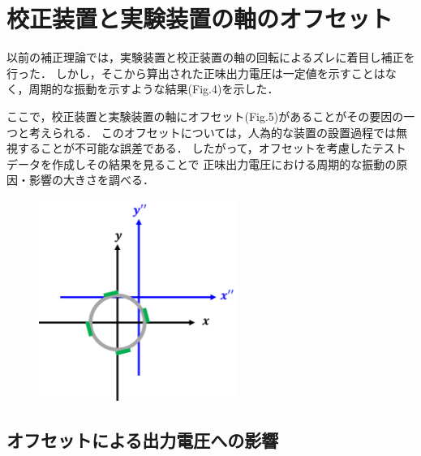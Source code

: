 \documentclass[twocolumn,a4j]{jsarticle}
\begin{document}


\section{校正装置と実験装置の軸のオフセット}

以前の補正理論では，実験装置と校正装置の軸の回転によるズレに着目し補正を行った．
しかし，そこから算出された正味出力電圧は一定値を示すことはなく，周期的な振動を示すような結果(Fig.4)を示した．\par
ここで，校正装置と実験装置の軸にオフセット(Fig.5)があることがその要因の一つと考えられる．
このオフセットについては，人為的な装置の設置過程では無視することが不可能な誤差である．
したがって，オフセットを考慮したテストデータを作成しその結果を見ることで
正味出力電圧における周期的な振動の原因・影響の大きさを調べる．

\begin{figure}[htbp]
    \footnotesize
    \begin{center}
        \includegraphics[width=65mm]{../images/image_5.png}
        \caption{}
    \end{center}
\end{figure}

\newpage

\subsection{オフセットによる出力電圧への影響}
\end{document}
